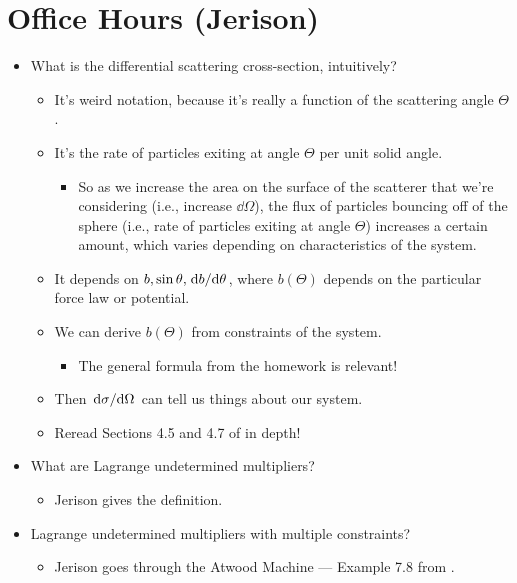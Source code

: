 \documentclass[../notes.tex]{subfiles}
\begin{document}
\section{Office Hours (Jerison)}
\begin{itemize}
    \item What is the differential scattering cross-section, intuitively?
    \begin{itemize}
        \item It's weird notation, because it's really a function of the scattering angle $\Theta$.
        \item It's the rate of particles exiting at angle $\Theta$ per unit solid angle.
        \begin{itemize}
            \item So as we increase the area on the surface of the scatterer that we're considering (i.e., increase $\dd{\Omega}$), the flux of particles bouncing off of the sphere (i.e., rate of particles exiting at angle $\Theta$) increases a certain amount, which varies depending on characteristics of the system.
        \end{itemize}
        \item It depends on $b,\sin\theta,\dv*{b}{\theta}$, where $b(\Theta)$ depends on the particular force law or potential.
        \item We can derive $b(\Theta)$ from constraints of the system.
        \begin{itemize}
            \item The general formula from the homework is relevant!
        \end{itemize}
        \item Then $\dv*{\sigma}{\Omega}$ can tell us things about our system.
        \item Reread Sections 4.5 and 4.7 of \textcite{bib:KibbleBerkshire} in depth!
    \end{itemize}
    \item What are Lagrange undetermined multipliers?
    \begin{itemize}
        \item Jerison gives the definition.
    \end{itemize}
    \item Lagrange undetermined multipliers with multiple constraints?
    \begin{itemize}
        \item Jerison goes through the Atwood Machine --- Example 7.8 from \textcite{bib:ThorntonMarion}.

\end{itemize}
\end{itemize}
\end{document}
